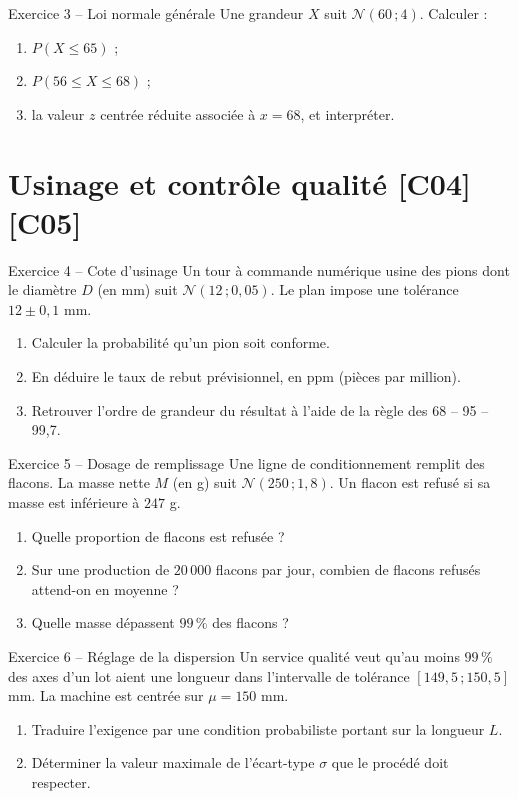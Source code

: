 \documentclass[a4paper,11pt]{article}
\begin{document}
\begin{exo}{Exercice 3 -- Loi normale générale}
Une grandeur $X$ suit $\mathcal{N}(60\,;4)$. Calculer :
\begin{enumerate}[label=\alph*)]
  \item $P(X \leq 65)$ ;
  \item $P(56 \leq X \leq 68)$ ;
  \item la valeur $z$ centrée réduite associée à $x = 68$, et interpréter.
\end{enumerate}
\end{exo}

\section{Usinage et contrôle qualité \hfill {\normalsize\color{uimmred}[C04]\,[C05]}}

\begin{exo}{Exercice 4 -- Cote d'usinage}
Un tour à commande numérique usine des pions dont le diamètre $D$ (en mm) suit $\mathcal{N}(12\,;0{,}05)$. Le plan impose une tolérance $12 \pm 0{,}1$ mm.
\begin{enumerate}[label=\alph*)]
  \item Calculer la probabilité qu'un pion soit conforme.
  \item En déduire le taux de rebut prévisionnel, en ppm (pièces par million).
  \item Retrouver l'ordre de grandeur du résultat à l'aide de la règle des 68 -- 95 -- 99,7.
\end{enumerate}
\end{exo}

\begin{exo}{Exercice 5 -- Dosage de remplissage}
Une ligne de conditionnement remplit des flacons. La masse nette $M$ (en g) suit $\mathcal{N}(250\,;1{,}8)$. Un flacon est refusé si sa masse est inférieure à $247$ g.
\begin{enumerate}[label=\alph*)]
  \item Quelle proportion de flacons est refusée ?
  \item Sur une production de $20\,000$ flacons par jour, combien de flacons refusés attend-on en moyenne ?
  \item Quelle masse dépassent $99\,\%$ des flacons ?
\end{enumerate}
\end{exo}

\begin{exo}{Exercice 6 -- Réglage de la dispersion}
Un service qualité veut qu'au moins $99\,\%$ des axes d'un lot aient une longueur dans l'intervalle de tolérance $[149{,}5\,;150{,}5]$ mm. La machine est centrée sur $\mu = 150$ mm.
\begin{enumerate}[label=\alph*)]
  \item Traduire l'exigence par une condition probabiliste portant sur la longueur $L$.
  \item Déterminer la valeur maximale de l'écart-type $\sigma$ que le procédé doit respecter.
\end{enumerate}
\end{exo}
\end{document}
